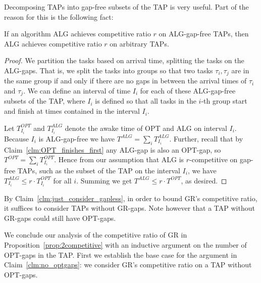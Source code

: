 Decomposing TAPs into gap-free subsets of the TAP is very useful.
Part of the reason for this is the following fact:
\begin{claim}
  \label{clm:just_consider_gapless}
  If an algorithm ALG achieves competitive ratio $r$ on
  ALG-gap-free TAPs, then ALG achieves 
  competitive ratio $r$ on arbitrary TAPs.
\end{claim}
\begin{proof}
  We partition the tasks based on arrival time, splitting the
  tasks on the ALG-gaps. That is, we split the tasks into groups
  so that two tasks $\tau_i, \tau_j$ are in the same group if and
  only if there are no gaps in between the arrival times of
  $\tau_i$ and $\tau_j$.
  We can define an interval of time $I_i$ for each of these
  ALG-gap-free subsets of the TAP, where $I_i$ is defined so that
  all tasks in the $i$-th group start and finish at times
  contained in the interval $I_i$.

  Let $T_{I_i}^{OPT}$ and $T_{I_i}^{ALG}$ denote the awake time
  of OPT and ALG on interval $I_i$. Because $I_i$ is ALG-gap-free
  we have $T^{ALG} = \sum_{i} T^{ALG}_{I_i}$.
  Further, recall that by Claim~\ref{clm:OPT_finishes_first} any
  ALG-gap is also an OPT-gap, so
  $T^{OPT} = \sum_{i} T_{I_i}^{OPT}$. 
  Hence from our assumption that ALG is $r$-competitive on
  gap-free TAPs, such as the subset of the TAP on the interval
  $I_i$, we have $T_{I_i}^{ALG} \le r\cdot T_{I_i}^{OPT}$ for
  all $i$. Summing we get $T^{ALG} \le r\cdot T^{OPT}$, as desired.
  
\end{proof}

By Claim~\ref{clm:just_consider_gapless}, in order to bound GR's
competitive ratio, it suffices to consider TAPs
without GR-gaps. Note however that a TAP without
GR-gaps could still have OPT-gaps.

We conclude our analysis of the competitive ratio of GR in
Proposition~\ref{prop:2competitive} with an inductive argument on
the number of OPT-gaps in the TAP.
First we establish the base case for the argument in
Claim~\ref{clm:no_optgaps}: we consider
GR's competitive ratio on a TAP without OPT-gaps.  

